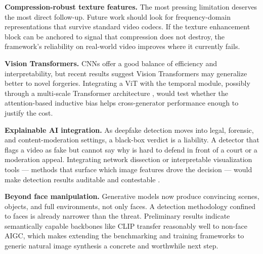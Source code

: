 \textbf{Compression-robust texture features.} The most pressing limitation deserves the most direct follow-up. Future work should look for frequency-domain representations that survive standard video codecs. If the texture enhancement block can be anchored to signal that compression does not destroy, the framework's reliability on real-world video improves where it currently fails.

\textbf{Vision Transformers.} CNNs offer a good balance of efficiency and interpretability, but recent results suggest Vision Transformers may generalize better to novel forgeries. Integrating a ViT with the temporal module, possibly through a multi-scale Transformer architecture \citep{Wang2024MultiModal}, would test whether the attention-based inductive bias helps cross-generator performance enough to justify the cost.

\textbf{Explainable AI integration.} As deepfake detection moves into legal, forensic, and content-moderation settings, a black-box verdict is a liability. A detector that flags a video as fake but cannot say why is hard to defend in front of a court or a moderation appeal. Integrating network dissection or interpretable visualization tools — methods that surface which image features drove the decision — would make detection results auditable and contestable \citep{Wang2025M2F2Det}.

\textbf{Beyond face manipulation.} Generative models now produce convincing scenes, objects, and full environments, not only faces. A detection methodology confined to faces is already narrower than the threat. Preliminary results indicate semantically capable backbones like CLIP transfer reasonably well to non-face AIGC, which makes extending the benchmarking and training frameworks to generic natural image synthesis a concrete and worthwhile next step.
